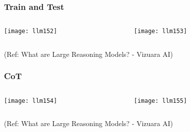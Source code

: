 \begin{frame}[fragile]\frametitle{Train and Test}


\begin{columns}
    \begin{column}[T]{0.5\linewidth}
		\begin{center}
		\texttt{[image: llm152]}
		\end{center}

    \end{column}
    \begin{column}[T]{0.5\linewidth}
		\begin{center}
		\texttt{[image: llm153]}
		\end{center}
    \end{column}
  \end{columns}
  

{\tiny (Ref: What are Large Reasoning Models? - Vizuara AI)}

\end{frame}

\begin{frame}[fragile]\frametitle{CoT}


\begin{columns}
    \begin{column}[T]{0.5\linewidth}
		\begin{center}
		\texttt{[image: llm154]}
		\end{center}

    \end{column}
    \begin{column}[T]{0.5\linewidth}
		\begin{center}
		\texttt{[image: llm155]}
		\end{center}
    \end{column}
  \end{columns}
  

{\tiny (Ref: What are Large Reasoning Models? - Vizuara AI)}

\end{frame}


